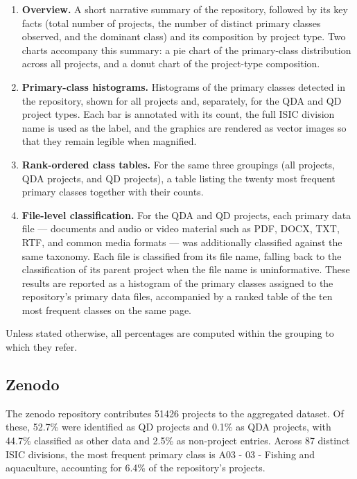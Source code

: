\begin{enumerate}
    \item \textbf{Overview.} A short narrative summary of the repository, followed by its key facts (total number of projects, the number of distinct primary classes observed, and the dominant class) and its composition by project type. Two charts accompany this summary: a pie chart of the primary-class distribution across all projects, and a donut chart of the project-type composition.

    \item \textbf{Primary-class histograms.} Histograms of the primary classes detected in the repository, shown for all projects and, separately, for the QDA and QD project types. Each bar is annotated with its count, the full ISIC division name is used as the label, and the graphics are rendered as vector images so that they remain legible when magnified.

    \item \textbf{Rank-ordered class tables.} For the same three groupings (all projects, QDA projects, and QD projects), a table listing the twenty most frequent primary classes together with their counts.

    \item \textbf{File-level classification.} For the QDA and QD projects, each primary data file --- documents and audio or video material such as PDF, DOCX, TXT, RTF, and common media formats --- was additionally classified against the same taxonomy. Each file is classified from its file name, falling back to the classification of its parent project when the file name is uninformative. These results are reported as a histogram of the primary classes assigned to the repository's primary data files, accompanied by a ranked table of the ten most frequent classes on the same page.
\end{enumerate}

Unless stated otherwise, all percentages are computed within the grouping to which they refer.

\clearpage

\subsection{Zenodo}


The zenodo repository contributes 51426 projects to the aggregated dataset. Of these, 52.7\% were identified as QD projects and 0.1\% as QDA projects, with 44.7\% classified as other data and 2.5\% as non-project entries. Across 87 distinct ISIC divisions, the most frequent primary class is A03 - 03 - Fishing and aquaculture, accounting for 6.4\% of the repository's projects.


